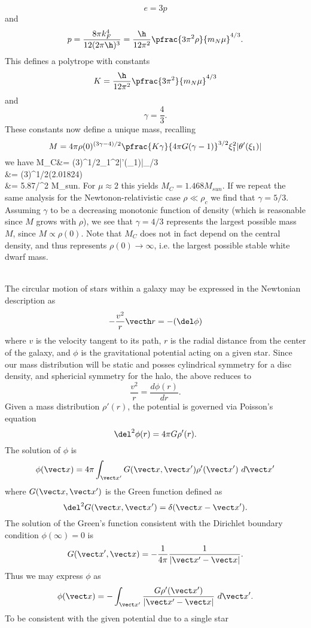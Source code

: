 \documentclass[10pt,letterpaper]{article}
\begin{document}
\[
	e = 3p
\]
and
\[
	p = \frac{8\pi k_F^4}{12(2\pi\h)^3} = \frac{\h}{12\pi^2}\pfrac{3\pi^2\rho}{m_N\mu}^{4/3}.
\]
This defines a polytrope with constants
\[
	K = \frac{\h}{12\pi^2}\pfrac{3\pi^2}{m_N\mu}^{4/3}
\]
and 
\[
	\gamma = \frac43.
\]
These constants now define a unique mass, recalling 
\[
	M=4\pi \rho(0)^{(3\gamma-4)/2}\pfrac{K\gamma}{4\pi G(\gamma-1)}^{3/2}\xi_1^2|\theta'(\xi_1)|
\]
we have
\ba
	M_C&=  (3\pi)^{1/2}\xi_1^2|\theta'(\xi_1)|_{/3}\\
	&=   (3\pi)^{1/2}(2.01824)\\
	&= 5.87/\mu^2 M_{sun}.
\ea
For $\mu \approx 2$ this yields $M_C = 1.468 M_{sun}$. If we repeat the same analysis for the Newtonon-relativistic case $\rho \ll \rho_c$ we find that $\gamma = 5/3$. Assuming $\gamma$ to be a decreasing monotonic function of density (which is reasonable since $M$ grows with $\rho$), we see that $\gamma = 4/3$ represents the largest possible mass $M$, since $M\propto \rho(0)$. Note that $M_C$ does not in fact depend on the central density, and thus represents $\rho(0)\to \infty$, i.e. the largest possible stable white dwarf mass. 
\\ \\
\item
The circular motion of stars within a galaxy may be expressed in the Newtonian description as
\[
	-\frac{v^2}{r}\vecth r = -(\del \phi)
\]
where $v$ is the velocity tangent to its path, $r$ is the radial distance from the center of the galaxy, and $\phi$ is the gravitational potential acting on a given star. Since our mass distribution will be static and posses cylindrical symmetry for a disc density, and sphericial symmetry for the halo, the above reduces to
\[
	\frac{v^2}{r} = \frac{d\phi(r)}{dr}.
\]
Given a mass distribution $\rho'(r)$, the potential is governed via Poisson's equation
\[
	\del^2\phi(r) = 4\pi G\rho'(r).
\]
The solution of $\phi$ is 
\[
	\phi(\vect x) =4\pi \int_{\vect x'} G(\vect x,\vect x')\rho'(\vect x')\ d\vect x'
\]
where $G(\vect x,\vect x')$ is the Green function defined as
\[
	\del^2G(\vect x,\vect x') =  \delta(\vect x-\vect x').
\]
The solution of the Green's function consistent with the Dirichlet boundary condition $\phi(\infty) = 0$ is
\[
	G(\vect x',\vect x) =-\frac{1}{4\pi}\frac{1}{|\vect x'-\vect x|}.
\]
Thus we may express $\phi$ as
\[
	\phi(\vect x) =- \int_{\vect x'}\frac{G\rho'(\vect x')}{|\vect x'-\vect x|}\ d\vect x'.
\]
To be consistent with the given potential due to a single star 
\end{document}
